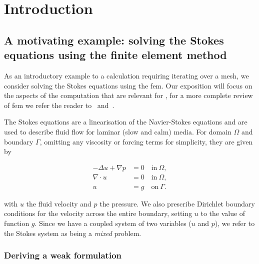 \documentclass[thesis]{subfiles}
\begin{document}
\chapter{Introduction}
\label{chapter:introduction}



\section{A motivating example: solving the Stokes equations using the finite element method}
\label{sec:stokes_equations}

As an introductory example to a calculation requiring iterating over a mesh, we consider solving the Stokes equations using the \gls{fem}.
Our exposition will focus on the aspects of the computation that are relevant for , for a more complete review of \gls{fem} we refer the reader to~\cite{brennerMathematicalTheoryFinite2008} and~\cite{larsonFiniteElementMethod2013}.

The Stokes equations are a linearisation of the Navier-Stokes equations and are used to describe fluid flow for laminar (slow and calm) media.
For domain $\Omega$ and boundary $\Gamma$, omitting any viscosity or forcing terms for simplicity, they are given by

\begin{subequations}
  \begin{align}
    - \Delta u + \nabla p &= 0 \quad \textrm{in} \ \Omega, \\
    \nabla \cdot u &= 0 \quad \textrm{in} \ \Omega, \\
    u &= g \quad \textrm{on} \ \Gamma.
  \end{align}
  \label{eq:strong_stokes}
\end{subequations}

with $u$ the fluid velocity and $p$ the pressure.
We also prescribe Dirichlet boundary conditions for the velocity across the entire boundary, setting $u$ to the value of function $g$.
Since we have a coupled system of two variables ($u$ and $p$), we refer to the Stokes system as being a \textit{mixed} problem.

\subsection{Deriving a weak formulation}
\end{document}

